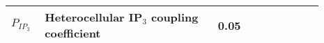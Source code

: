 \documentclass[fleqn]{report}
\numberwithin{equation}{section}
\numberwithin{equation}{section}
\begin{document}
 		\begin{table}[h!]
 		\centering
 		\begin{tabular}{ p{0.09\linewidth}  >{\footnotesize} p{0.5\linewidth}  >{\footnotesize} p{0.27\linewidth} >{\footnotesize} p{0.03\linewidth} }
 		\hline
 		$P_{IP_{3}}$      		& Heterocellular IP$_{3}$ coupling coefficient	& 0.05 \pers	&  \cite{Koenigsberger2006} \\
 		\hline
 		\end{tabular}
 		\label{tab:JCA3couplingi}
 		\end{table}
% 		
\end{document}
